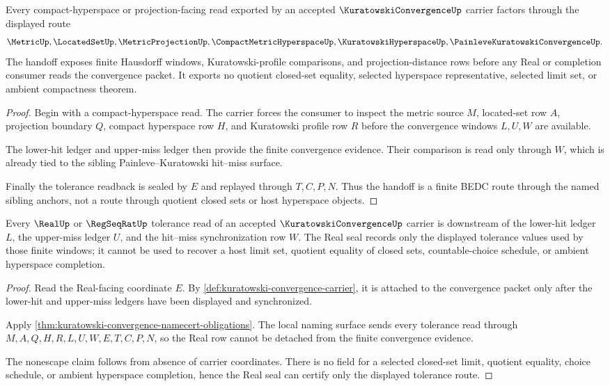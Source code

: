 \begin{theorem}
\label{thm:kuratowski-convergence-metric-hyperspace-handoff}
Every compact-hyperspace or projection-facing read exported by an accepted $\KuratowskiConvergenceUp$ carrier factors through the displayed route
$$
\MetricUp,\LocatedSetUp,\MetricProjectionUp,\CompactMetricHyperspaceUp,\KuratowskiHyperspaceUp,\PainleveKuratowskiConvergenceUp .
$$
The handoff exposes finite Hausdorff windows, Kuratowski-profile comparisons, and projection-distance rows before any Real or completion consumer reads the convergence packet. It exports no quotient closed-set equality, selected hyperspace representative, selected limit set, or ambient compactness theorem.
\end{theorem}
\begin{proof}
Begin with a compact-hyperspace read. The carrier forces the consumer to inspect the metric source $M$, located-set row $A$, projection boundary $Q$, compact hyperspace row $H$, and Kuratowski profile row $R$ before the convergence windows $L,U,W$ are available.

The lower-hit ledger and upper-miss ledger then provide the finite convergence evidence. Their comparison is read only through $W$, which is already tied to the sibling Painleve--Kuratowski hit--miss surface.

Finally the tolerance readback is sealed by $E$ and replayed through $T,C,P,N$. Thus the handoff is a finite BEDC route through the named sibling anchors, not a route through quotient closed sets or host hyperspace objects.
\end{proof}

\begin{theorem}
\label{thm:kuratowski-convergence-real-seal-nonescape}
Every $\RealUp$ or $\RegSeqRatUp$ tolerance read of an accepted $\KuratowskiConvergenceUp$ carrier is downstream of the lower-hit ledger $L$, the upper-miss ledger $U$, and the hit--miss synchronization row $W$. The Real seal records only the displayed tolerance values used by those finite windows; it cannot be used to recover a host limit set, quotient equality of closed sets, countable-choice schedule, or ambient hyperspace completion.
\end{theorem}
\begin{proof}
Read the Real-facing coordinate $E$. By \autoref{def:kuratowski-convergence-carrier}, it is attached to the convergence packet only after the lower-hit and upper-miss ledgers have been displayed and synchronized.

Apply \autoref{thm:kuratowski-convergence-namecert-obligations}. The local naming surface sends every tolerance read through $M,A,Q,H,R,L,U,W,E,T,C,P,N$, so the Real row cannot be detached from the finite convergence evidence.

The nonescape claim follows from absence of carrier coordinates. There is no field for a selected closed-set limit, quotient equality, choice schedule, or ambient hyperspace completion, hence the Real seal can certify only the displayed tolerance route.
\end{proof}

